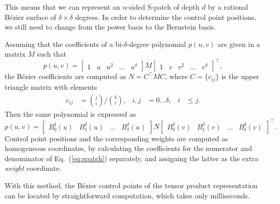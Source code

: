 \documentclass[9pt,academicons]{article}
\begin{document}
This means that we can represent an $n$-sided S-patch of depth $d$ by a rational B\'ezier
surface of $\delta\times\delta$ degrees. In order to determine the control point positions,
we still need to change from the power basis to the Bernstein basis.

Assuming that the coefficients of a bi-$\delta$-degree polynomial $p(u,v)$
are given in a matrix $M$ such that
\begin{equation}
  \label{eq:power}
  p(u,v)=
  \left[\begin{array}{ccccc}1&u&u^2&\dots&u^\delta\end{array}\right]
  M
  \left[\begin{array}{ccccc}1&v&v^2&\dots&v^\delta\end{array}\right]^\top,
\end{equation}
the B\'ezier coefficients are computed as $N=C^\top MC$, where $C=\{c_{ij}\}$ is
the upper triangle matrix with elements
\begin{equation}
  \begin{aligned}
    c_{ij}&={j\choose i}\bigg/{\delta\choose i}, & i,j&=0\dots\delta, & i&\leq j.
  \end{aligned}
\end{equation}
Then the same polynomial is expressed as
\begin{equation}
  \label{eq:bernstein}
  p(u,v)=
  \left[\begin{array}{cccc}B_0^\delta(u)&B_1^\delta(u)&\dots&B_\delta^\delta(u)\end{array}\right]
  N
  \left[\begin{array}{cccc}B_0^\delta(v)&B_1^\delta(v)&\dots&B_\delta^\delta(v)\end{array}\right]^\top.
\end{equation}
Control point positions and the corresponding weights are computed as homogeneous coordinates,
by calculating the coefficients for the numerator and denominator of Eq.~(\ref{eq:spatch})
separately, and assigning the latter as the extra \emph{weight} coordinate.

With this method, the B\'ezier control points of the tensor product representation
can be located by straightforward computation, which takes only milliseconds.
\end{document}

